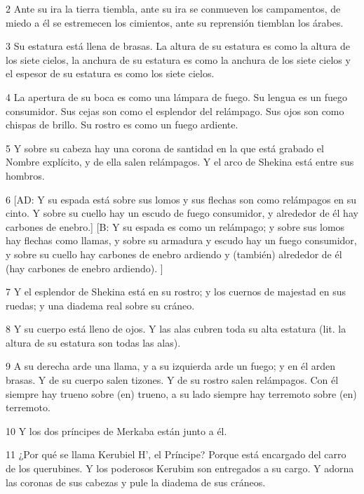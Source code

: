 \par 2 Ante su ira la tierra tiembla, ante su ira se conmueven los campamentos, de miedo a él se estremecen los cimientos, ante su reprensión tiemblan los árabes.

\par 3 Su estatura está llena de brasas. La altura de su estatura es como la altura de los siete cielos, la anchura de su estatura es como la anchura de los siete cielos y el espesor de su estatura es como los siete cielos.

\par 4 La apertura de su boca es como una lámpara de fuego. Su lengua es un fuego consumidor. Sus cejas son como el esplendor del relámpago. Sus ojos son como chispas de brillo. Su rostro es como un fuego ardiente.

\par 5 Y sobre su cabeza hay una corona de santidad en la que está grabado el Nombre explícito, y de ella salen relámpagos. Y el arco de Shekina está entre sus hombros.

\par 6 [AD: Y su espada está sobre sus lomos y sus flechas son como relámpagos en su cinto. Y sobre su cuello hay un escudo de fuego consumidor, y alrededor de él hay carbones de enebro.] [B: Y su espada es como un relámpago; y sobre sus lomos hay flechas como llamas, y sobre su armadura y escudo hay un fuego consumidor, y sobre su cuello hay carbones de enebro ardiendo y (también) alrededor de él (hay carbones de enebro ardiendo). ]

\par 7 Y el esplendor de Shekina está en su rostro; y los cuernos de majestad en sus ruedas; y una diadema real sobre su cráneo.

\par 8 Y su cuerpo está lleno de ojos. Y las alas cubren toda su alta estatura (lit. la altura de su estatura son todas las alas).

\par 9 A su derecha arde una llama, y ​​a su izquierda arde un fuego; y en él arden brasas. Y de su cuerpo salen tizones. Y de su rostro salen relámpagos. Con él siempre hay trueno sobre (en) trueno, a su lado siempre hay terremoto sobre (en) terremoto.

\par 10 Y los dos príncipes de Merkaba están junto a él.

\par 11 ¿Por qué se llama Kerubiel H', el Príncipe? Porque está encargado del carro de los querubines. Y los poderosos Kerubim son entregados a su cargo. Y adorna las coronas de sus cabezas y pule la diadema de sus cráneos.


